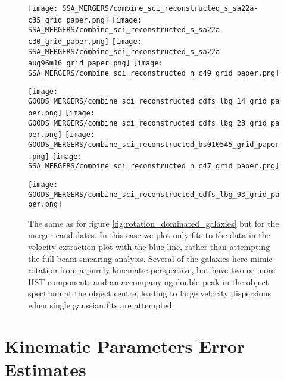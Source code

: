 \documentclass[fleqn,usenatbib]{mn2e}
\begin{document}
\begin{figure*}\ContinuedFloat
    \centering

    \texttt{[image: SSA\_MERGERS/combine\_sci\_reconstructed\_s\_sa22a-c35\_grid\_paper.png]}
    \texttt{[image: SSA\_MERGERS/combine\_sci\_reconstructed\_s\_sa22a-c30\_grid\_paper.png]}
    \texttt{[image: SSA\_MERGERS/combine\_sci\_reconstructed\_s\_sa22a-aug96m16\_grid\_paper.png]}
    \texttt{[image: SSA\_MERGERS/combine\_sci\_reconstructed\_n\_c49\_grid\_paper.png]}    


\end{figure*}

\begin{figure*}\ContinuedFloat
    \centering

    \texttt{[image: GOODS\_MERGERS/combine\_sci\_reconstructed\_cdfs\_lbg\_14\_grid\_paper.png]}
    \texttt{[image: GOODS\_MERGERS/combine\_sci\_reconstructed\_cdfs\_lbg\_23\_grid\_paper.png]}
    \texttt{[image: GOODS\_MERGERS/combine\_sci\_reconstructed\_bs010545\_grid\_paper.png]}
    \texttt{[image: SSA\_MERGERS/combine\_sci\_reconstructed\_n\_c47\_grid\_paper.png]}


\end{figure*}

\begin{figure*}\ContinuedFloat
    \centering

    \texttt{[image: GOODS\_MERGERS/combine\_sci\_reconstructed\_cdfs\_lbg\_93\_grid\_paper.png]}

    \caption{The same as for figure \protect\ref{fig:rotation_dominated_galaxies} but for the merger candidates.
    In this case we plot only fits to the data in the velocity extraction plot with the blue line, rather than attempting the full beam-smearing analysis.
    Several of the galaxies here mimic rotation from a purely kinematic perspective, but have two or more HST components and an accompanying double peak in the object spectrum at the object centre, leading to large velocity dispersions when single gaussian fits are attempted.}
    \label{fig:merger_galaxies}
\end{figure*}

\section{Kinematic Parameters Error Estimates}\label{app:kin_error_estimates}
\end{document}
